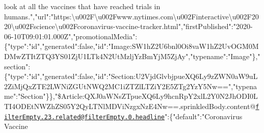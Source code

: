 look at all the vaccines that have reached trials in
humans.","url":"https:\textbackslash{}u002F\textbackslash{}u002Fwww.nytimes.com\textbackslash{}u002Finteractive\textbackslash{}u002F2020\textbackslash{}u002Fscience\textbackslash{}u002Fcoronavirus-vaccine-tracker.html","firstPublished":"2020-06-10T09:01:01.000Z","promotionalMedia":\{"type":"id","generated":false,"id":"Image:SW1hZ2U6bnl0Oi8vaW1hZ2UvOGM0MDMwZTItZTQ3YS01ZjU1LTk4N2UtMzljYzBmYjM5ZjAy","typename":"Image"\},"section":\{"type":"id","generated":false,"id":"Section:U2VjdGlvbjpueXQ6Ly9zZWN0aW9uL2ZiMjQxZTE2LWNiZGUtNWQ2MC1iZTZlLTZiY2E5ZTg2YzY5Nw==","typename":"Section"\}\},"\$Article:QXJ0aWNsZTpueXQ6Ly9hcnRpY2xlL2Y0N2JhODI0LTI4ODEtNWZhZS05Y2QyLTNlMDViNzgxNzE4Nw==.sprinkledBody.content@\href{mailto:filterEmpty.23.related@filterEmpty.0.headline}{\nolinkurl{filterEmpty.23.related@filterEmpty.0.headline}}":\{"default":"Coronavirus
Vaccine
